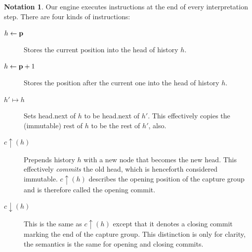 \documentclass[english]{sigplanconf}
\theoremstyle{definition}
\newtheorem*{notation}{Notation}
\begin{document}
\begin{notation}
Our engine executes instructions at the end of every interpretation
step. There are four kinds of instructions:

\begin{description}
\item [$h\leftarrow\mathbf{\mathbf{p}}$] Stores the current position into the head of history $h$.
\item [$h\leftarrow\mathbf{\mathbf{p}}+1$] Stores the position after the current one into the head of history $h$.
\item [$h'\mapsto h$] Sets head.next of $h$ to be head.next of $h'$. 
	This effectively copies the (immutable) rest of $h$ to be the rest of $h'$, also. 
\item [$c\uparrow(h)$] Prepends history $h$ with a new node that becomes the new head.
	This effectively \emph{commits} the old head, which is henceforth considered immutable. $c\uparrow(h)$
	describes the opening position of the capture group and is therefore called the opening commit. 
\item [$c\downarrow(h)$] This is the same as $c\uparrow(h)$ except that it denotes a closing commit marking the end of the capture group. 
	This distinction is only for clarity, the semantics is the same for opening and closing commits.
\end{description}

\end{notation}
\end{document}
